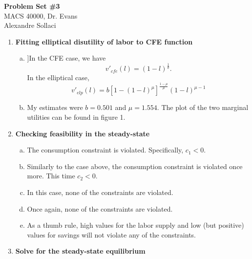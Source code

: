 \documentclass[letterpaper,12pt]{article}
\theoremstyle{definition}
\begin{document}
\begin{flushleft}
   \textbf{\large{Problem Set \#3}} \\
   MACS 40000, Dr. Evans \\
   Alexandre Sollaci
\end{flushleft}

\vspace{5mm}

\noindent\begin{enumerate}
   \item \textbf{Fitting elliptical disutility of labor to CFE function}
 	\begin{enumerate}[(a)]
 	\item ]In the CFE case, we have
 	\[ v'_{cfe}(l) = (1-l)^{\frac{1}{\theta}} .\]
 	In the elliptical case, 
 	\[ v'_{elp}(l) = b\left[1 - (1-l)^{\mu}\right]^{\frac{1-\mu}{\mu}} (1-l)^{\mu - 1}\]
 	\item My estimates were $b = 0.501$ and $\mu = 1.554$. The plot of the two marginal utilities can be found in figure 1.
 	\end{enumerate}
	
	\item \textbf{Checking feasibility in the steady-state}
	
	\begin{enumerate}[(a)]
	\item The consumption constraint is violated. Specifically, $c_1 < 0$.
	\item Similarly to the case above, the consumption constraint is violated once more. This time $c_2 < 0$.
	\item In this case, none of the constraints are violated.
	\item Once again, none of the constraints are violated.
	\item As a thumb rule, high values for the labor supply and low (but positive) values for savings will not violate any of the constraints.
	\end{enumerate}
	
	\item \textbf{Solve for the steady-state equilibrium}
	

\end{enumerate}
\end{document}
